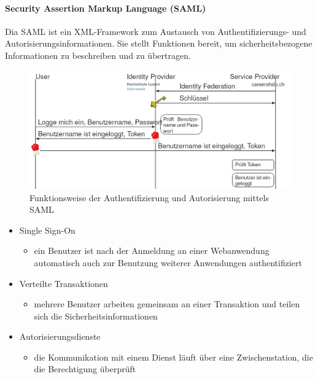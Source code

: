 \documentclass[10pt,a4paper]{article}
\begin{document}
\paragraph*{Security Assertion Markup Language (SAML)}\label{saml}Dia SAML ist ein XML-Framework zum Austausch von Authentifizierungs- und Autorisierungsinformationen. Sie stellt Funktionen bereit, um sicherheitsbezogene Informationen zu beschreiben und zu übertragen.\cite{wiki}
\begin{figure}[H]
    \begin{center}
    \includegraphics[width=12cm]{images/SAML.png}
    \caption{Funktionsweise der Authentifizierung und Autorisierung mittels SAML}
    \label{SAML}
    \end{center}
\end{figure}
\begin{itemize}[noitemsep,topsep=0pt,leftmargin=*]
    \item Single Sign-On
    \begin{itemize}[noitemsep,topsep=0pt,leftmargin=*]
        \item ein Benutzer ist nach der Anmeldung an einer Webanwendung automatisch auch zur Benutzung weiterer Anwendungen authentifiziert
    \end{itemize}
    \item Verteilte Transaktionen
    \begin{itemize}[noitemsep,topsep=0pt,leftmargin=*]
        \item mehrere Benutzer arbeiten gemeinsam an einer Transaktion und teilen sich die Sicherheitsinformationen
    \end{itemize}
    \item Autorisierungsdienste
    \begin{itemize}[noitemsep,topsep=0pt,leftmargin=*]
        \item die Kommunikation mit einem Dienst läuft über eine Zwischenstation, die die Berechtigung überprüft
    \end{itemize}
\end{itemize}
\end{document}

